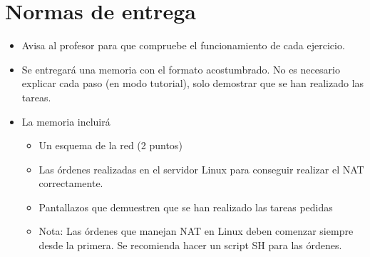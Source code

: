 \section{Normas de entrega}
\begin{itemize}
\item Avisa al profesor para que compruebe el funcionamiento de cada ejercicio. 
\item Se entregará una memoria con el formato acostumbrado. No es necesario explicar cada paso (en modo tutorial), solo demostrar que se han realizado las tareas.
\item La memoria incluirá

  \begin{itemize}
  \item Un esquema de la red (2 puntos)
  \item Las órdenes realizadas en el servidor Linux para conseguir realizar el NAT correctamente.
  \item Pantallazos que demuestren que se han realizado las tareas pedidas
  \item
    \begin{small}
      Nota: Las órdenes que manejan NAT en Linux deben comenzar siempre desde la primera. Se recomienda hacer un script SH para las órdenes.
    \end{small}
    
  \end{itemize}

\end{itemize}


